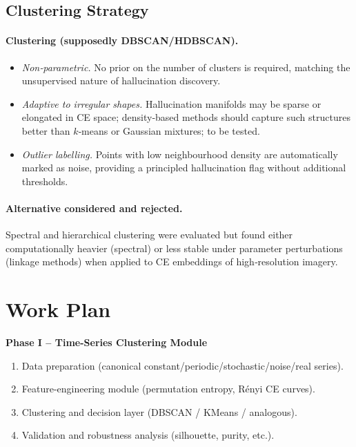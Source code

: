 \documentclass{article}
\begin{document}
\subsection{Clustering Strategy}

\vspace{-0.3\baselineskip}
\paragraph{Clustering (supposedly DBSCAN/HDBSCAN).}
\begin{itemize}
\item \emph{Non‑parametric.}  No prior on the number of clusters is
      required, matching the unsupervised nature of hallucination
      discovery.
\item \emph{Adaptive to irregular shapes.}  Hallucination manifolds may be
      sparse or elongated in CE space; density‑based methods should capture
      such structures better than $k$‑means or Gaussian mixtures; to be tested.
\item \emph{Outlier labelling.}  Points with low neighbourhood density
      are automatically marked as noise, providing a principled
      hallucination flag without additional thresholds.
\end{itemize}

\vspace{-0.6\baselineskip}
\paragraph{Alternative considered and rejected.}
Spectral and hierarchical clustering were evaluated but found either
computationally heavier (spectral) or less stable under parameter
perturbations (linkage methods) when applied to CE embeddings of
high‑resolution imagery.

\section{Work Plan}\label{sec:work_plan}

\bigskip
\textbf{Phase I – Time-Series Clustering Module}
\begin{enumerate}
\item Data preparation (canonical constant/periodic/stochastic/noise/real series).
\item Feature-engineering module (permutation entropy, Rényi CE curves).
\item Clustering and decision layer (DBSCAN / KMeans / analogous).
\item Validation and robustness analysis (silhouette, purity, etc.).
\end{enumerate}
\end{document}
